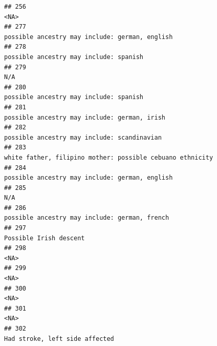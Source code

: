 \documentclass[]{article}
\begin{document}
\begin{verbatim}
## 256                                                                                                                                                <NA>
## 277                                                                                                      possible ancestry may include: german, english
## 278                                                                                                              possible ancestry may include: spanish
## 279                                                                                                                                                 N/A
## 280                                                                                                              possible ancestry may include: spanish
## 281                                                                                                        possible ancestry may include: german, irish
## 282                                                                                                         possible ancestry may include: scandinavian
## 283                                                                                           white father, filipino mother: possible cebuano ethnicity
## 284                                                                                                      possible ancestry may include: german, english
## 285                                                                                                                                                 N/A
## 286                                                                                                       possible ancestry may include: german, french
## 297                                                                                                                              Possible Irish descent
## 298                                                                                                                                                <NA>
## 299                                                                                                                                                <NA>
## 300                                                                                                                                                <NA>
## 301                                                                                                                                                <NA>
## 302                                                                                                                      Had stroke, left side affected

\end{verbatim}
\end{document}
